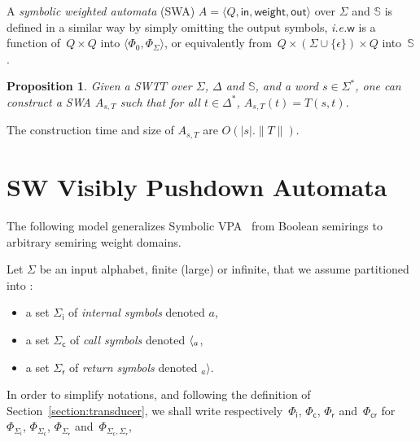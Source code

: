 \documentclass[a4paper,11pt]{article}
\newtheorem{proposition}[theorem]{Proposition}
\def\ie{\textit{i.e.}\xspace}
\def\<#1>{\langle #1 \rangle}
\newcommand{\Semiring}{\mathbb{S}}
\def\SWT{\textsf{SWT}\xspace}
\def\SWA{\textsf{SWA}\xspace}
\def\weight{\mathsf{weight}}
\def\wei{\mathsf{w}}
\def\init{\mathsf{in}}
\def\final{\mathsf{out}}
\newcommand{\call}[1]{\ensuremath \langle_{#1}}
\newcommand{\return}[1]{\ensuremath {}_{#1}{\rangle}} %
\def\Sigmai{{\Sigma_\mathsf{i}}}
\def\Sigmac{{\Sigma_\mathsf{c}}}
\def\Sigmar{{\Sigma_\mathsf{r}}}
\def\Phii{{\Phi_\mathsf{i}}}
\def\Phic{{\Phi_\mathsf{c}}}
\def\Phir{{\Phi_\mathsf{r}}}
\def\Phicr{{\Phi_\mathsf{cr}}}
\begin{document}
A \emph{symbolic weighted automata} (\SWA) $A = \< Q, \init, \weight, \final >$
over $\Sigma$ and $\Semiring$ 
is defined in a similar way by simply omitting the output symbols,
\ie $\wei$ is a function of~$Q \times Q$ into %
$\< \Phi_0, \Phi_\Sigma >$, 
or equivalently from~$Q \times (\Sigma \cup \{ \epsilon \}) \times Q$ into~$\Semiring$.


\begin{proposition}
Given a \SWT $T$ 
over $\Sigma$, $\Delta$ and $\Semiring$, 
and a word $s \in \Sigma^*$, 
one can construct a \SWA 
$A_{s, T}$ such that for all $t \in \Delta^*$, 
$A_{s, T}(t) = T(s, t)$.
\end{proposition}
The construction time and size of $A_{s, T}$ are $O(| s | . \| T \|)$.



\section{SW Visibly Pushdown Automata}
\label{section:SWVPA}
The following model generalizes Symbolic VPA~\cite{DAntonyAlur14SVPDA}
from Boolean semirings to arbitrary semiring weight domains.

Let $\Sigma$ be an input alphabet, finite (large) or infinite,
that we assume partitioned into :
\begin{itemize}
\item a set $\Sigmai$ of \emph{internal symbols} denoted $a$,
\item a set $\Sigmac$ of \emph{call symbols} denoted $\call{a}$,
\item a set $\Sigmar$ of \emph{return symbols} denoted $\return{a}$.
\end{itemize}
In order to simplify notations, and following the definition of Section~\ref{section:transducer}, 
we shall write respectively~$\Phii$, $\Phic$, $\Phir$ and~$\Phicr$
for~$\Phi_\Sigmai$, $\Phi_\Sigmac$, $\Phi_\Sigmar$ and~$\Phi_{\Sigmac, \Sigmar}$, 
\end{document}
